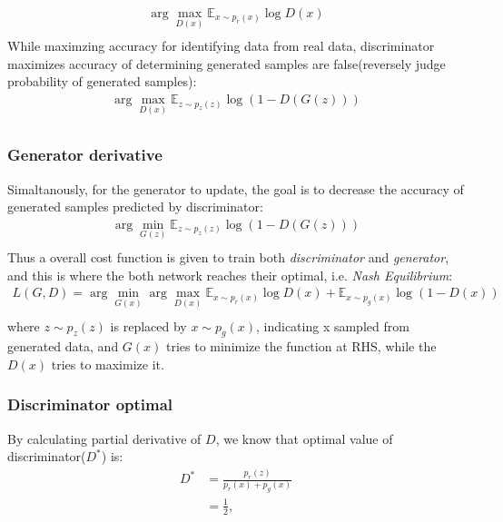 \documentclass{article}
\newcommand{\argmax}{\arg\!\max}
\newcommand{\argmin}{\arg\!\min}
\begin{document}
{\begin{equation}
\begin{gathered}
\argmax_{D(x)} \mathbb{E}_{x\sim p_{r}(x)} \log{D(x)}\\
\end{gathered}
\end{equation}
While maximzing accuracy for identifying data from real data, discriminator maximizes accuracy of determining generated samples are false(reversely judge probability of generated samples):
\begin{equation}
    \begin{gathered}
\argmax_{D(x)} \mathbb{E}_{z\sim p_{z}(z)} \log{(1-D(G(z)))}\\
    \end{gathered}
\end{equation}
\subsubsection*{Generator derivative}
Simaltanously, for the generator to update, the goal is to decrease the accuracy of generated samples predicted by discriminator:
\begin{equation}
    \begin{gathered}
\argmin_{G(z)} \mathbb{E}_{z\sim p_{z}(z)} \log{(1-D(G(z)))}\\
    \end{gathered}
\end{equation}
Thus a overall cost function is given to train both \textit{discriminator} and \textit{generator}, and this is where the both network reaches their optimal, i.e. \textit{Nash Equilibrium}:
\begin{equation}
    \begin{gathered}
\textit{L}(G,D) = \argmin_{G(x)} \argmax_{D(x)} \mathbb{E}_{x\sim p_{r}(x)} \log{D(x)} + \mathbb{E}_{x\sim p_{g}(x)} \log{(1-D(x))}\\
    \end{gathered}
\end{equation}
where $z\sim p_z{(z)}$ is replaced by $x\sim p_g{(x)}$, indicating x sampled from generated data, and $G(x)$ tries to minimize the function at RHS, while the $D(x)$ tries to maximize it.
\subsubsection*{Discriminator optimal}
By calculating partial derivative of $D$, we know that optimal value of discriminator($D^*$) is:
\begin{align}\label{eq5}
D^{*} &= \frac{p_{r}(z)}{p_{r}(x)+p_{g}(x)} \nonumber\\
&= \frac{1}{2},
\end{align}

}
\end{document}
